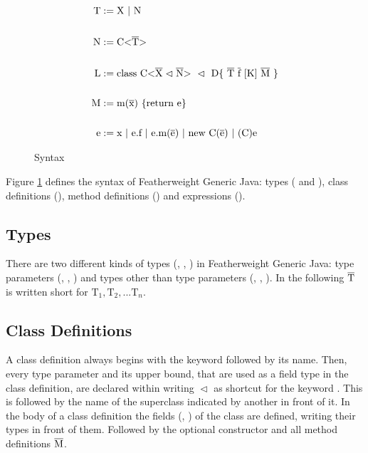 \begin{figure}[tp]
    \begin{align*}
        \text{T} &:= \text{X} \ | \ \text{N}\\
        \\
        \text{N} &:= \text{C} \vv{\ot{T}}\\
        \\
        \text{L} &:= \text{class} \ \text{C} \xn \ \vartriangleleft \ \text{D} \{ \ \ot{T} \ \ot{f} \ [\text{K}] \ \ot{M} \ \}\\
        \\
        \text{M} &:= \text{m}(\ot{x}) \ \{\text{return e}\}\\
        \\
        \text{e} &:= \text{x} \ | \ \text{e.f} \ | \ \text{e.m(}\ot{e}\text{)} \ | \ \text{new C(}\ot{e}\text{)} \ | \ \text{(C)e}
    \end{align*}
    \caption{Syntax}
    \label{syntax}
\end{figure}

Figure \ref{syntax} defines the syntax of Featherweight Generic Java: types ( and ), class definitions (), method definitions () and expressions ().

\subsection{Types}

There are two different kinds of types (, , ) in Featherweight Generic Java:
type parameters (, , ) and types other than type parameters (, , ).
In the following $\overline{\text{T}}$ is written short for $\text{T}_1, \text{T}_2, ... \text{T}_n$.

\subsection{Class Definitions}

A class definition  always begins with the keyword  followed by its name. Then, every type parameter and its upper bound, that are used as a field type in the class definition, are declared within \inl{<>} writing $\vartriangleleft$ as shortcut for the keyword .
This is followed by the name of the superclass indicated by another  in front of it. In the body of a class definition the fields (, ) of the class are defined, writing their types in front of them. Followed by the optional constructor  and all method definitions $\overline{\text{M}}$.

